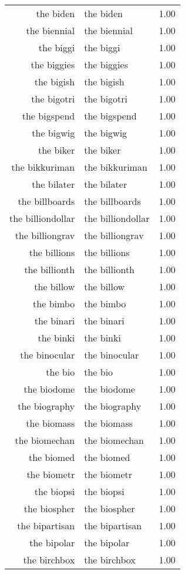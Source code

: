 \begin{table}[ht]
\begin{tabular}{rlr}
  the biden & the biden & 1.00 \\ 
  the biennial & the biennial & 1.00 \\ 
  the biggi & the biggi & 1.00 \\ 
  the biggies & the biggies & 1.00 \\ 
  the bigish & the bigish & 1.00 \\ 
  the bigotri & the bigotri & 1.00 \\ 
  the bigspend & the bigspend & 1.00 \\ 
  the bigwig & the bigwig & 1.00 \\ 
  the biker & the biker & 1.00 \\ 
  the bikkuriman & the bikkuriman & 1.00 \\ 
  the bilater & the bilater & 1.00 \\ 
  the billboards & the billboards & 1.00 \\ 
  the billiondollar & the billiondollar & 1.00 \\ 
  the billiongrav & the billiongrav & 1.00 \\ 
  the billions & the billions & 1.00 \\ 
  the billionth & the billionth & 1.00 \\ 
  the billow & the billow & 1.00 \\ 
  the bimbo & the bimbo & 1.00 \\ 
  the binari & the binari & 1.00 \\ 
  the binki & the binki & 1.00 \\ 
  the binocular & the binocular & 1.00 \\ 
  the bio & the bio & 1.00 \\ 
  the biodome & the biodome & 1.00 \\ 
  the biography & the biography & 1.00 \\ 
  the biomass & the biomass & 1.00 \\ 
  the biomechan & the biomechan & 1.00 \\ 
  the biomed & the biomed & 1.00 \\ 
  the biometr & the biometr & 1.00 \\ 
  the biopsi & the biopsi & 1.00 \\ 
  the biospher & the biospher & 1.00 \\ 
  the bipartisan & the bipartisan & 1.00 \\ 
  the bipolar & the bipolar & 1.00 \\ 
  the birchbox & the birchbox & 1.00 \\ 

\end{tabular}
\end{table}
